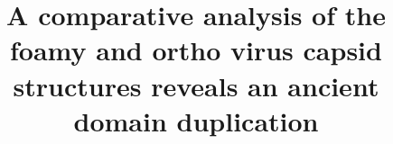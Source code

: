 \documentclass{bmcart}
\begin{document}
\begin{frontmatter}

\begin{fmbox}


\title{A comparative analysis of the foamy and ortho virus capsid structures
           reveals an ancient domain duplication}


\author[
   addressref={aff1},                   %
   email={william.taylor@crick.co.uk}   %
]{ }
\author[
   addressref={aff2},
   email={jonathan.stoye@crick.co.uk}
]{ }
\author[
   addressref={aff3},
   email={ian.taylor@crick.co.uk}
]{ }


\address[id=aff1]{%
  ,
  ,
  ,                     %
  ,                             %
}
\address[id=aff2]{%
,
}
\address[id=aff3]{%
,
}


\end{fmbox}
\end{frontmatter}
\end{document}
